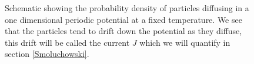 \documentclass[11pt]{article} %
\begin{document}
\begin{figure}[tb]
	\centering
\quad
\caption{Schematic showing the probability density of particles diffusing in a one dimensional periodic potential at a fixed temperature. We see that the particles tend to drift down the potential as they diffuse, this drift will be called the current $J$ which we will quantify in section \ref{Smoluchowski}.}
\label{fig:Schematic}
\end{figure}
\end{document}
